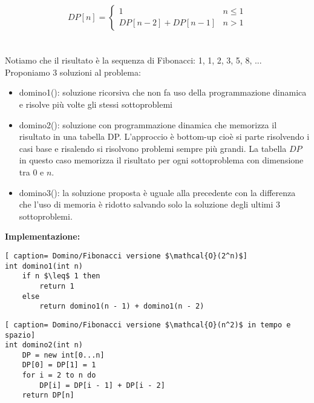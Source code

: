 \documentclass[../cheatSheetAlgoritmi.tex]{subfiles}
\begin{document}
\begin{equation*}
  	DP[n] =\begin{cases}
    	1 & \text{$n \leq 1$}\\
    	DP[n-2] + DP[n-1] & \text{$n > 1$}
  	\end{cases}
\end{equation*}\\\\
Notiamo che il risultato è la sequenza di Fibonacci: 1, 1, 2, 3, 5, 8, ... \\
Proponiamo 3 soluzioni al problema:
\begin{itemize}
	\item domino1(): soluzione ricorsiva che non fa uso della programmazione dinamica e risolve più volte gli stessi sottoproblemi
	\item domino2(): soluzione con programmazione dinamica che memorizza il risultato in una tabella DP. L'approccio è bottom-up cioè si parte risolvendo i casi base e risalendo si risolvono problemi sempre più grandi. La tabella $DP$ in questo caso memorizza il risultato per ogni sottoproblema con dimensione tra 0 e $n$.
	\item domino3(): la soluzione proposta è uguale alla precedente con la differenza che l'uso di memoria è ridotto salvando solo la soluzione degli ultimi 3 sottoproblemi. 
\end{itemize}
\newpage
\noindent
\textbf{Implementazione:}
\begin{lstlisting}[ caption= Domino/Fibonacci versione $\mathcal{O}(2^n)$]
int domino1(int n)
	if n $\leq$ 1 then
		return 1
	else
		return domino1(n - 1) + domino1(n - 2)
\end{lstlisting}

\begin{lstlisting}[ caption= Domino/Fibonacci versione $\mathcal{O}(n^2)$ in tempo e spazio]
int domino2(int n)
	DP = new int[0...n]
	DP[0] = DP[1] = 1
	for i = 2 to n do
		DP[i] = DP[i - 1] + DP[i - 2]
	return DP[n]
\end{lstlisting}
\end{document}
